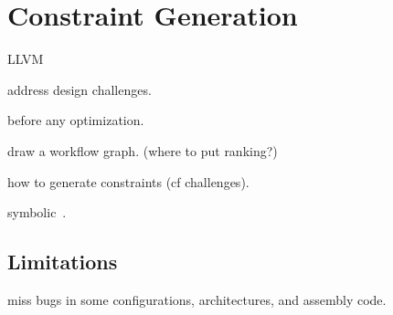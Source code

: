 \section{Constraint Generation}
\label{s:gen}

LLVM~\cite{lattner:llvm}

address design challenges.

before any optimization.

draw a workflow graph. (where to put ranking?)

how to generate constraints (cf challenges).

symbolic~\cite{engelen:symbolic}.

\subsection{Limitations}

miss bugs in some configurations, architectures,
and assembly code.
